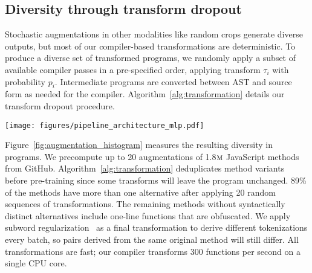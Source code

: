 \documentclass[11pt]{article}
\newcommand{\million}[0]{$\textsc{m}$}
\newcommand{\ours}[0]{ContraCode}
\begin{document}
\subsection{Diversity through transform dropout} \label{sec:diverse_aug}

Stochastic augmentations in other modalities like random crops generate diverse outputs, but most of our compiler-based transformations are deterministic. To produce a diverse set of transformed programs, we randomly apply a subset of available compiler passes in a pre-specified order, applying transform $\tau_i$ with probability $p_i$. Intermediate programs are converted between AST and source form as needed for the compiler. Algorithm~\ref{alg:transformation} details our transform dropout procedure.

\begin{figure*}[t]
    \centering
    \texttt{[image: figures/pipeline\_architecture\_mlp.pdf]}
    \caption{\ours{} pre-trains a neural program encoder $f_q$ and transfers it to downstream tasks. \textbf{A-B.} Unlabeled programs are transformed \textbf{C.} into augmented variants. \textbf{D.} We pre-train $f_q$ by maximizing similarity of projected embeddings of \textit{positive} program pairs--variants of the same program--and minimizing similarity with a queue of cached negatives. \textbf{E.} \ours{} supports any architecture for $f_q$ that produces a global program embedding such as Transformers and LSTMs. $f_q$ is then fine-tuned on smaller labeled datasets.}
    \label{fig:training}
\end{figure*}

Figure~\ref{fig:augmentation_histogram} measures the resulting diversity in programs. We precompute up to 20 augmentations of 1.8\million{} JavaScript methods from GitHub. Algorithm~\ref{alg:transformation} deduplicates method variants before pre-training since some transforms will leave the program unchanged. 89\% of the methods have more than one alternative after applying 20 random sequences of transformations.
The remaining methods without syntactically distinct alternatives include one-line functions that are obfuscated.
We apply subword regularization~\citep{kudo2018subword} as a final transformation to derive different tokenizations every batch, so pairs derived from the same original method will still differ.
All transformations are fast; our compiler transforms 300 functions per second on a single CPU core.
\end{document}
